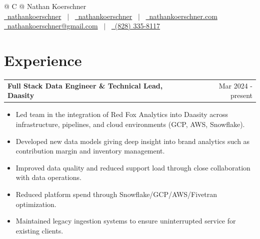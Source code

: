\documentclass[a4paper,12pt]{article}
\makeatletter
\newenvironment{joblong}[2]
    {
    \begin{tabularx}{\linewidth}{@{}l X r@{}}
    \textbf{#1} & \hfill &  #2 \\[3.75pt]
    \end{tabularx}
    \begin{minipage}[t]{\linewidth}
    \begin{itemize}[nosep,after=\strut, leftmargin=1em, itemsep=3pt,label=--]
    }
    {
    \end{itemize}
    \end{minipage}    
    }
\makeatother
\begin{document}
\pagestyle{empty} 



\begin{tabularx}{\linewidth}{@{} C @{}}
\Huge{Nathan Koerschner} \\[7.5pt]

\href{https://github.com/nathankoerschner}{\raisebox{-0.05\height}\faGithub\ nathankoerschner} \ $|$ \
\href{https://linkedin.com/in/nathankoerschner}{\raisebox{-0.05\height}\faLinkedin\ nathankoerschner} \ $|$ \
\href{https://nathankoerschner.com}{\raisebox{-0.05\height}\faGlobe \ nathankoerschner.com} \\[4pt]

\href{mailto:nathankoerschner@gmail.com}{\raisebox{-0.05\height}\faEnvelope \ nathankoerschner@gmail.com} \ $|$ \
\href{tel:+8283358117}{\raisebox{-0.05\height}\faMobile \ (828) 335-8117} \\

\end{tabularx}


\section{Experience}

\begin{joblong}{ Full Stack Data Engineer \& Technical Lead, Daasity}{Mar 2024 - present}
\item Led team in the integration of Red Fox Analytics into Daasity across infrastructure, pipelines, and cloud environments (GCP, AWS, Snowflake).
\item Developed new data models giving deep insight into brand analytics such as contribution margin and inventory management.
\item Improved data quality and reduced support load through close collaboration with data operations.
\item Reduced platform spend through Snowflake/GCP/AWS/Fivetran optimization.
\item Maintained legacy ingestion systems to ensure uninterrupted service for existing clients.
\end{joblong}
\end{document}
